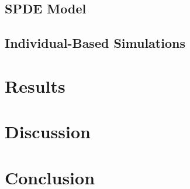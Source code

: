 \documentclass{article}
\begin{document}
\hypertarget{spde-model}{%
\subsection{SPDE Model}\label{spde-model}}

\hypertarget{individual-based-simulations}{%
\subsection{Individual-Based
Simulations}\label{individual-based-simulations}}

\hypertarget{results}{%
\section{Results}\label{results}}

\hypertarget{discussion}{%
\section{Discussion}\label{discussion}}

\hypertarget{conclusion}{%
\section{Conclusion}\label{conclusion}}



\end{document}
